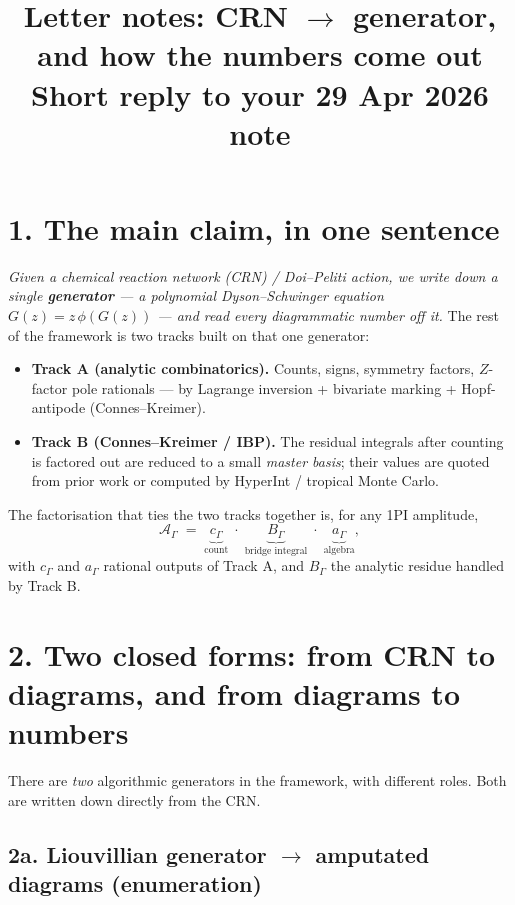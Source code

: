\documentclass[11pt,a4paper]{article}
\title{\large Letter notes: CRN $\to$ generator, and how the numbers come out\\[2pt]
\normalsize Short reply to your 29 Apr 2026 note}
\author{}
\date{}
\begin{document}
\maketitle
\vspace{-2em}

\section*{1. The main claim, in one sentence}

\emph{Given a chemical reaction network (CRN) / Doi--Peliti action, we write down a single \textbf{generator} --- a polynomial Dyson--Schwinger equation $G(z) = z\,\phi(G(z))$ --- and read every diagrammatic number off it.} The rest of the framework is two tracks built on that one generator:

\begin{itemize}[leftmargin=2em,itemsep=2pt]
  \item \textbf{Track A (analytic combinatorics).} Counts, signs, symmetry factors, $Z$-factor pole rationals --- by Lagrange inversion + bivariate marking + Hopf-antipode (Connes--Kreimer).
  \item \textbf{Track B (Connes--Kreimer / IBP).} The residual integrals after counting is factored out are reduced to a small \emph{master basis}; their values are quoted from prior work or computed by HyperInt / tropical Monte Carlo.
\end{itemize}

The factorisation that ties the two tracks together is, for any 1PI amplitude,
\[
  \mathcal{A}_\Gamma \;=\; \underbrace{c_\Gamma}_{\text{count}}
  \;\cdot\; \underbrace{B_\Gamma}_{\text{bridge integral}}
  \;\cdot\; \underbrace{a_\Gamma}_{\text{algebra}},
\]
with $c_\Gamma$ and $a_\Gamma$ rational outputs of Track A, and $B_\Gamma$ the analytic residue handled by Track B.

\section*{2. Two closed forms: from CRN to diagrams, and from diagrams to numbers}

There are \emph{two} algorithmic generators in the framework, with different roles. Both are written down directly from the CRN.

\subsection*{2a. Liouvillian generator $\to$ amputated diagrams (enumeration)}
\end{document}
